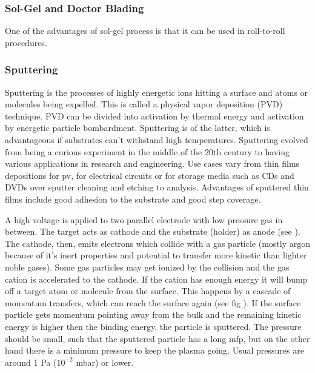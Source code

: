 \subsubsection{Sol-Gel and Doctor Blading}
One of the advantages of sol-gel process is that it can be used in roll-to-roll procedures.

\subsubsection{Sputtering}
Sputtering is the processes of highly energetic ions hitting a surface and atoms or molecules being expelled. 
This is called a physical vapor deposition (PVD) technique. 
PVD can be divided into activation by thermal energy and activation by energetic particle bombardment. 
Sputtering is of the latter, which 
is advantageous if substrates can't withstand high temperatures.
Sputtering evolved from being a curious experiment in the middle of the 20th century to having various applications in research and engineering.
Use cases vary from thin films depositions for \gls{pv}, for electrical circuits or for storage media such as CDs and DVDs 
over sputter cleaning and etching to analysis.
Advantages of 
sputtered thin films include good adhesion to the substrate and good step coverage. 

A high voltage is applied to 
two parallel electrode with low pressure gas in between. 
The target acts as cathode and the substrate (holder) as anode (see ).
The cathode, then, emits electrons which collide with a gas particle (mostly argon because of it's inert properties and potential to transfer more kinetic than lighter noble gases). 
Some gas particles may get ionized by the collision and the gas cation is accelerated to the cathode. 
If the cation has enough energy it will bump off a target atom or molecule from the surface. 
This happens by a cascade of momentum transfers, which can reach the surface again (see fig ). 
If the surface particle gets momentum pointing away from the bulk and the remaining kinetic energy is higher then the binding energy, the particle is sputtered. 
The pressure should be small, such that the sputtered particle has a long \gls{mfp}, but on the other hand there is a minimum pressure to keep the plasma going. 
Usual pressures are around 1 Pa ($10^{-2}$ mbar) or lower\cite{Swann1988}.

